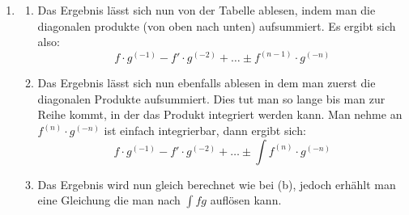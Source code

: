 \documentclass[7pt,landscape, margin = 0.1mm]{article}
\begin{document}
\begin{multicols}{4}
\begin{flushleft}
{\begin{enumerate}
\begin{center}
\begin{tabular}{l|ll}
    & $D$ & $I$ \\ \hline
$+$   & $f$   & $g$   \\
$-$   &  $f'$ &  $\int g = g^{(-1)}$ \\ 
$+$   & $f''$  &   $g^{(-2)}$ \\ 
$\ldots$   &  &   \\ 
$\pm$ & $f^{(n)} = 0$  &  $g^{(-n)}$  \\ 
\end{tabular}
\end{center}
\item
\begin{enumerate}
\item Das Ergebnis lässt sich nun von der Tabelle ablesen, indem man die diagonalen produkte (von oben nach unten) aufsummiert. Es ergibt sich also:
$$f \cdot g^{(-1)} - f'\cdot g^{(-2)}  + \ldots  \pm f^{(n-1)}\cdot g^{(-n)}$$
\item Das Ergebnis lässt sich nun ebenfalls ablesen in dem man zuerst die diagonalen Produkte aufsummiert. Dies tut man so lange bis man zur Reihe kommt, in der das Produkt integriert werden kann. Man nehme an $f^{(n)} \cdot g^{(-n)}$ ist einfach integrierbar, dann ergibt sich:
$$ f \cdot g^{(-1)} - f'\cdot g^{(-2)}  + \ldots  \pm \int f^{(n)}\cdot g^{(-n)}$$
\item Das Ergebnis wird nun gleich berechnet wie bei (b), jedoch erhählt man eine Gleichung die man nach $\int fg$ auflösen kann.

\end{enumerate}

\end{enumerate}
}


\end{flushleft}
\end{multicols}
\end{document}
